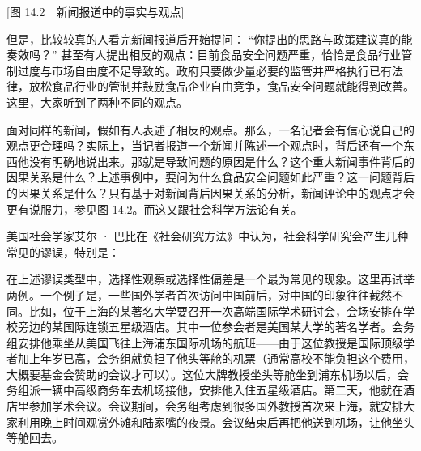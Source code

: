 [图 14.2　新闻报道中的事实与观点]

但是，比较较真的人看完新闻报道后开始提问： “你提出的思路与政策建议真的能奏效吗？” 甚至有人提出相反的观点：目前食品安全问题严重，恰恰是食品行业管制过度与市场自由度不足导致的。政府只要做少量必要的监管并严格执行已有法律，放松食品行业的管制并鼓励食品企业自由竞争，食品安全问题就能得到改善。这里，大家听到了两种不同的观点。

面对同样的新闻，假如有人表述了相反的观点。那么，一名记者会有信心说自己的观点更合理吗？实际上，当记者报道一个新闻并陈述一个观点时，背后还有一个东西他没有明确地说出来。那就是导致问题的原因是什么？这个重大新闻事件背后的因果关系是什么？上述事例中，要问为什么食品安全问题如此严重？这一问题背后的因果关系是什么？只有基于对新闻背后因果关系的分析，新闻评论中的观点才会更有说服力，参见图 14.2。而这又跟社会科学方法论有关。


美国社会学家艾尔 · 巴比在《社会研究方法》中认为，社会科学研究会产生几种常见的谬误，特别是：


在上述谬误类型中，选择性观察或选择性偏差是一个最为常见的现象。这里再试举两例。一个例子是，一些国外学者首次访问中国前后，对中国的印象往往截然不同。比如，位于上海的某著名大学要召开一次高端国际学术研讨会，会场安排在学校旁边的某国际连锁五星级酒店。其中一位参会者是美国某大学的著名学者。会务组安排他乘坐从美国飞往上海浦东国际机场的航班——由于这位教授是国际顶级学者加上年岁已高，会务组就负担了他头等舱的机票（通常高校不能负担这个费用，大概要基金会赞助的会议才可以）。这位大牌教授坐头等舱坐到浦东机场以后，会务组派一辆中高级商务车去机场接他，安排他入住五星级酒店。第二天，他就在酒店里参加学术会议。会议期间，会务组考虑到很多国外教授首次来上海，就安排大家利用晚上时间观赏外滩和陆家嘴的夜景。会议结束后再把他送到机场，让他坐头等舱回去。

